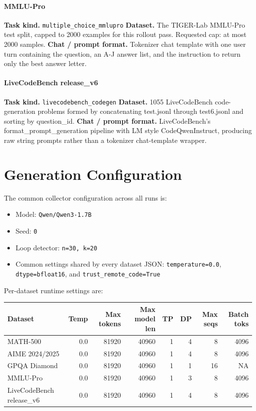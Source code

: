 \documentclass[11pt]{article}
\begin{document}
\paragraph{MMLU-Pro}
\textbf{Task kind.} \texttt{multiple\_choice\_mmlupro}
\textbf{Dataset.} The TIGER-Lab MMLU-Pro test split, capped to 2000 examples for this rollout pass. Requested cap: at most 2000 samples.
\textbf{Chat / prompt format.} Tokenizer chat template with one user turn containing the question, an A-J answer list, and the instruction to return only the best answer letter.

\paragraph{LiveCodeBench release\_v6}
\textbf{Task kind.} \texttt{livecodebench\_codegen}
\textbf{Dataset.} 1055 LiveCodeBench code-generation problems formed by concatenating test.jsonl through test6.jsonl and sorting by question\_id.
\textbf{Chat / prompt format.} LiveCodeBench's format\_prompt\_generation pipeline with LM style CodeQwenInstruct, producing raw string prompts rather than a tokenizer chat-template wrapper.

\section*{Generation Configuration}
The common collector configuration across all runs is:
\begin{itemize}[leftmargin=1.5em]
\item Model: \texttt{Qwen/Qwen3-1.7B}
\item Seed: \texttt{0}
\item Loop detector: \texttt{n=30, k=20}
\item Common settings shared by every dataset JSON: \texttt{temperature=0.0}, \texttt{dtype=bfloat16}, and \texttt{trust\_remote\_code=True}
\end{itemize}

Per-dataset runtime settings are:
\begin{tabular}{lrrrrrrr}
\toprule
Dataset & Temp & Max tokens & Max model len & TP & DP & Max seqs & Batch toks \\
\midrule
MATH-500 & 0.0 & 81920 & 40960 & 1 & 4 & 8 & 4096 \\
AIME 2024/2025 & 0.0 & 81920 & 40960 & 1 & 4 & 8 & 4096 \\
GPQA Diamond & 0.0 & 81920 & 40960 & 1 & 1 & 16 & NA \\
MMLU-Pro & 0.0 & 81920 & 40960 & 1 & 3 & 8 & 4096 \\
LiveCodeBench release\_v6 & 0.0 & 81920 & 40960 & 1 & 4 & 8 & 4096 \\
\bottomrule
\end{tabular}
\end{document}

